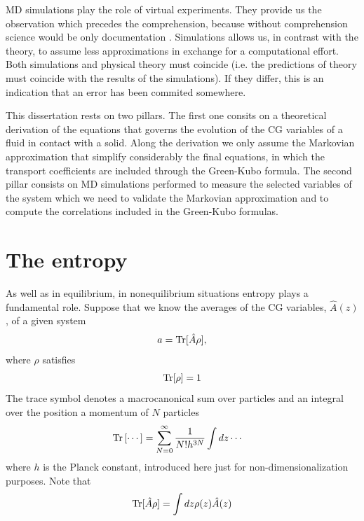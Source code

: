 \documentclass[b5paper,openright,10pt]{book}
\begin{document}
MD simulations play the role of virtual experiments. They provide us the observation which precedes the comprehension, because without comprehension science would be only documentation \cite{Rapaport}. Simulations allows us, in contrast with the theory, to assume less approximations in exchange for a computational effort. Both simulations and physical theory must coincide (i.e. the predictions of theory must coincide with the results of the simulations). If they differ, this is an indication that an error has been commited somewhere.

This dissertation rests on two pillars. The first one consits on a theoretical derivation of the equations that governs the evolution of the CG variables of a fluid in contact with a solid. 
Along the derivation we only assume the Markovian approximation that simplify considerably the final equations, in which the transport coefficients are included through the Green-Kubo formula. 
The second pillar consists on MD simulations performed to measure the selected variables of the system which we need to validate the Markovian approximation and to compute the correlations included in the Green-Kubo formulas.

\section{The entropy}\label{Sec:TheEntropy}
As well as in equilibrium, in nonequilibrium situations entropy plays a fundamental role. 
Suppose that we know the averages of the CG variables, $\hat{A}(z)$, of a given system 
\begin{align}
    a = {\rm Tr}[{\hat{A}}\rho] ,
    \label{ave0}
\end{align}
where $\rho$ satisfies
\begin{align}
    {\rm Tr}[\rho] = 1
    \label{intrho}
\end{align}
The trace symbol denotes a macrocanonical sum over particles and an integral over the position a momentum of $N$ particles
\begin{align}
  {\rm Tr}\left[\cdots\right]&=\sum_{N=0}^\infty \frac{1}{N!h^{3N}}
\int dz\cdots
\end{align}
where $h$ is the Planck constant, introduced here just for non-dimensionalization purposes. 
Note that 
\begin{align}
    {\rm Tr}[\hat{A}\rho] = \int dz\rho(z)\hat{A}(z) 
\end{align}
\end{document}
